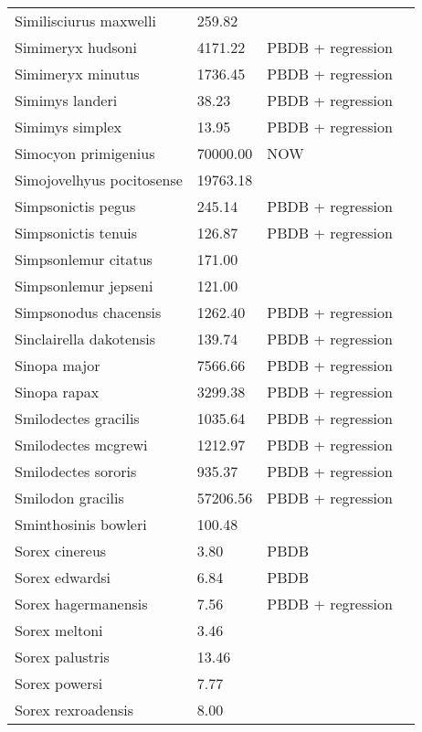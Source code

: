 \documentclass{article}
\begin{document}
\begin{center}
\begin{longtable}{p{} p{} p{} p{}}
    Similisciurus maxwelli & 259.82 & \cite{Tomiya2013} &  \\ 
    Simimeryx hudsoni & 4171.22 & PBDB + regression &  \\ 
    Simimeryx minutus & 1736.45 & PBDB + regression &  \\ 
    Simimys landeri & 38.23 & PBDB + regression &  \\ 
    Simimys simplex & 13.95 & PBDB + regression &  \\ 
    Simocyon primigenius & 70000.00 & NOW &  \\ 
    Simojovelhyus pocitosense & 19763.18 & \cite{Wang1999} &  \\ 
    Simpsonictis pegus & 245.14 & PBDB + regression &  \\ 
    Simpsonictis tenuis & 126.87 & PBDB + regression &  \\ 
    Simpsonlemur citatus & 171.00 & \cite{Soligo2006} &  \\ 
    Simpsonlemur jepseni & 121.00 & \cite{Soligo2006} &  \\ 
    Simpsonodus chacensis & 1262.40 & PBDB + regression &  \\ 
    Sinclairella dakotensis & 139.74 & PBDB + regression &  \\ 
    Sinopa major & 7566.66 & PBDB + regression &  \\ 
    Sinopa rapax & 3299.38 & PBDB + regression &  \\ 
    Smilodectes gracilis & 1035.64 & PBDB + regression &  \\ 
    Smilodectes mcgrewi & 1212.97 & PBDB + regression &  \\ 
    Smilodectes sororis & 935.37 & PBDB + regression &  \\ 
    Smilodon gracilis & 57206.56 & PBDB + regression &  \\ 
    Sminthosinis bowleri & 100.48 & \cite{Tomiya2013} &  \\ 
    Sorex cinereus & 3.80 & PBDB &  \\ 
    Sorex edwardsi & 6.84 & PBDB &  \\ 
    Sorex hagermanensis & 7.56 & PBDB + regression &  \\ 
    Sorex meltoni & 3.46 & \cite{Tomiya2013} &  \\ 
    Sorex palustris & 13.46 & \cite{Smith2004} &  \\ 
    Sorex powersi & 7.77 & \cite{Tomiya2013} &  \\ 
    Sorex rexroadensis & 8.00 & \cite{McKenna2011} &  \\ 

\end{longtable}
\end{center}
\end{document}
